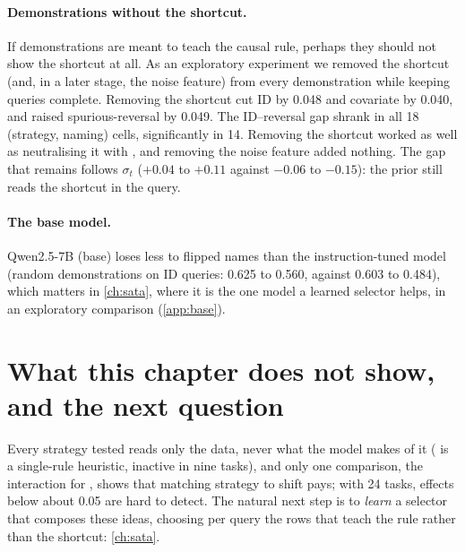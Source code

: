 \paragraph{Demonstrations without the shortcut.}
If demonstrations are meant to teach the causal rule, perhaps they should not show the shortcut at all.
As an exploratory experiment we removed the shortcut (and, in a later stage, the noise feature) from every demonstration while keeping queries complete.
Removing the shortcut cut ID \AUROC by 0.048 and covariate \AUROC by 0.040, and raised spurious-reversal \AUROC by 0.049.
The ID--reversal gap shrank in all 18 (strategy, naming) cells, significantly in 14.
Removing the shortcut worked as well as neutralising it with , and removing the noise feature added nothing.
The gap that remains follows $\sigma_t$ ($+0.04$ to $+0.11$ against $-0.06$ to $-0.15$): the prior still reads the shortcut in the query.




\paragraph{The base model.}
Qwen2.5-7B (base) loses less to flipped names than the instruction-tuned model (random demonstrations on ID queries: 0.625 to 0.560, against 0.603 to 0.484), which matters in \autoref{ch:sata}, where it is the one model a learned selector helps, in an exploratory comparison (\autoref{app:base}).

\newpage
\section{What this chapter does not show, and the next question}

Every strategy tested reads only the data, never what the model makes of it ( is a single-rule heuristic, inactive in nine tasks), and only one comparison, the interaction for , shows that matching strategy to shift pays; with 24 tasks, effects below about 0.05 \AUROC are hard to detect.
The natural next step is to \emph{learn} a selector that composes these ideas, choosing per query the rows that teach the rule rather than the shortcut: \autoref{ch:sata}.
